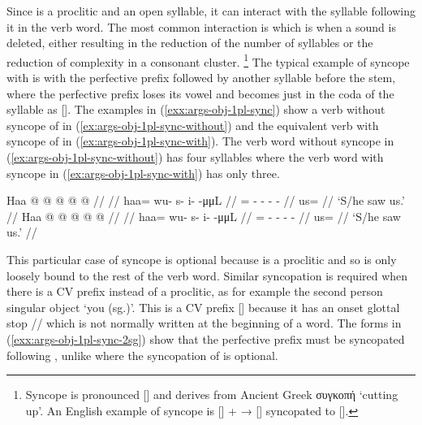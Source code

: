 Since  is a proclitic and an open syllable, it can interact with the syllable following it in the verb word.
The most common interaction is  which is when a sound is deleted, either resulting in the reduction of the number of syllables or the reduction of complexity in a consonant cluster.%
\footnote{Syncope is pronounced [] and derives from Ancient Greek συγκοπή  ‘cutting up’. An English example of syncope is  [] +  →  [] syncopated to  [].}
The typical example of syncope with  is with the perfective prefix  followed by another syllable before the stem, where the perfective prefix loses its vowel and becomes just  in the coda of the  syllable as [].
The examples in (\ref{exx:args-obj-1pl-sync}) show a verb without syncope of  in (\ref{ex:args-obj-1pl-sync-without}) and the equivalent verb with syncope of  in (\ref{ex:args-obj-1pl-sync-with}).
The verb word without syncope in (\ref{ex:args-obj-1pl-sync-without}) has four syllables where the verb word with syncope in (\ref{ex:args-obj-1pl-sync-with}) has only three.

\pex\label{exx:args-obj-1pl-sync}%
\a\label{ex:args-obj-1pl-sync-without}%
%
\begingl
	\gla	Haa @  @ {} @ {} @ {} @ {} //
	\glp	\llap{[}\rlap{\ipa{hàː.\gm{wù}.sì.ˈtʰìːn}]} {} {} {} {} {} //
	\glb	haa= wu- s- i-  -μμL //
	\glc	{}= - - -  - //
	\gld	us=  {} {} {} {} //
	\glft	‘S/he saw us.’
		//
\endgl
\a\label{ex:args-obj-1pl-sync-with}%
%
\begingl
	\gla	Haa @  @ {} @ {} @ {} @ {} //
	\glp	\llap{[}\rlap{\ipa{hàː\gm{w}.sì.ˈtʰìːn}]} {} {} {} {} {} //
	\glb	haa= wu- s- i-  -μμL //
	\glc	{}= - - -  - //
	\gld	us=  {} {} {} {} //
	\glft	‘S/he saw us.’
		//
\endgl
\xe

This particular case of syncope is optional because  is a proclitic and so is only loosely bound to the rest of the verb word.
Similar syncopation is required when there is a CV prefix instead of a proclitic, as for example the second person singular object  ‘you (sg.)’.
This is a CV prefix [] because it has an onset glottal stop // which is not normally written at the beginning of a word.
The forms in (\ref{exx:args-obj-1pl-sync-2sg}) show that the perfective  prefix must be syncopated following , unlike  where the syncopation of  is optional.

